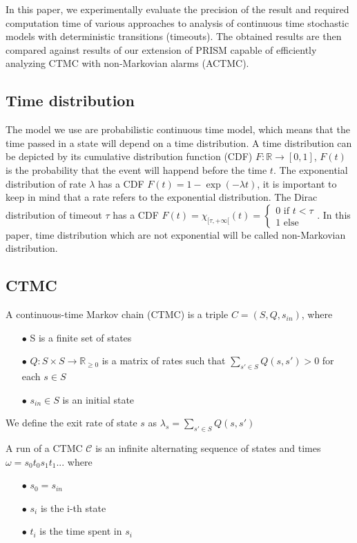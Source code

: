 \documentclass[runningheads,custombib]{llncs}
\begin{document}
	In this paper, we experimentally evaluate the precision of the result and required computation time of various approaches to analysis of continuous time stochastic models with deterministic transitions (timeouts). The obtained results are then compared against results of our extension of PRISM capable of efficiently analyzing CTMC with non-Markovian alarms (ACTMC).
	
	
\subsection{Time distribution}
The model we use are probabilistic continuous time model, which means that the time passed in a state will depend on a time distribution. A time distribution can be depicted by its cumulative distribution function (CDF) $F : \mathbb{R} \rightarrow[0,1]$, $F(t)$ is the probability that the event will happend before the time $t$. The exponential distribution of rate $\lambda$ has a CDF $F(t) = 1 - \exp(-\lambda t)$, it is important to keep in mind that a rate refers to the exponential distribution. The Dirac distribution of timeout $\tau$ has a CDF $F(t) = \chi_{[\tau,+\infty[}(t) = 
\left\{
	\begin{array}{l}
		0 \text{ if } t < \tau\\
		1\text{ else}
	\end{array}
\right.$. In this paper, time distribution which are not exponential will be called non-Markovian distribution.
\subsection{CTMC}
A continuous-time Markov chain (CTMC) is a triple $C = (S,Q,s_{in})$, where 
\begin{itemize}
	\item[$\bullet$] S is a finite set of states
	\item[$\bullet$] $Q : S \times S \rightarrow \mathbb{R}_{\geq 0}$ is a matrix of rates such that $\sum_{s' \in S} Q(s,s')  > 0$ for each $s \in S$
	\item[$\bullet$] $s_{in} \in S$ is an initial state
\end{itemize} 
We define the exit rate of state $s$ as $\lambda_s = \sum_{s' \in S} Q(s,s')$

A run of a CTMC $\mathcal{C}$ is an infinite alternating sequence of states and times $\omega = s_0t_0s_1t_1...$ where 
\begin{itemize}
	\item[$\bullet$] $s_0 = s_{in}$
	\item[$\bullet$] $s_i$ is the i-th state
	\item[$\bullet$] $t_i$ is the time spent in $s_i$
\end{itemize}
\end{document}
